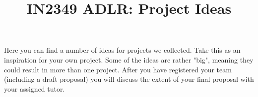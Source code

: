 \documentclass[a4paper]{article}
\title{IN2349 ADLR: Project Ideas}
\author{}
\begin{document}
\maketitle

Here you can find a number of ideas for projects we collected.
Take this as an inspiration for your own project.
Some of the ideas are rather "big", meaning they could result in more than one project.
After you have registered your team (including a draft proposal) you will discuss the extent of your final proposal with your assigned tutor.



\end{document}
